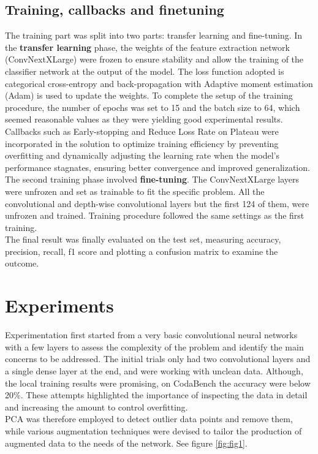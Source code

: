 \documentclass[11pt]{article}
\begin{document}
\begin{multicols}{2}
        \subsection{Training, callbacks and finetuning}
        The training part was split into two parts: transfer learning and fine-tuning. In the \textbf{transfer learning} phase, the weights of the feature extraction network (ConvNextXLarge) were frozen to ensure stability and allow the training of the classifier network at the output of the model. The loss function adopted is categorical cross-entropy and back-propagation with Adaptive moment estimation (Adam) \cite{warner_optimizer} is used to update the weights. To complete the setup of the training procedure, the number of epochs was set to 15 and the batch size to 64, which seemed reasonable values as they were yielding good experimental results. 
        Callbacks such as Early-stopping and Reduce Loss Rate on Plateau were incorporated in the solution to optimize training efficiency by preventing overfitting and dynamically adjusting the learning rate when the model's performance stagnates, ensuring better convergence and improved generalization.
        The second training phase involved \textbf{fine-tuning}. The ConvNextXLarge layers were unfrozen and set as trainable to fit the specific problem. All the convolutional and depth-wise convolutional layers but the first 124 of them, were unfrozen and trained. Training procedure followed the same settings as the first training. \\    
        The final result was finally evaluated on the test set, measuring accuracy, precision, recall, f1 score and plotting a confusion matrix to examine the outcome.

        
    \section{Experiments}
		Experimentation first started from a very basic convolutional neural networks with a few layers to assess the complexity of the problem and identify the main concerns to be addressed. The initial trials only had two convolutional layers and a single dense layer at the end, and were working with unclean data. 
        Although, the local training results were promising, on CodaBench the accuracy were below 20\%.
        These attempts highlighted the importance of inspecting the data in detail and increasing the amount to control overfitting. \\  
        PCA \cite{jolliffe2016principal} was therefore employed to detect outlier data points and remove them, while various augmentation techniques were devised to tailor the production of augmented data to the needs of the network. See figure \ref{fig:fig1}.


\end{multicols}
\end{document}
